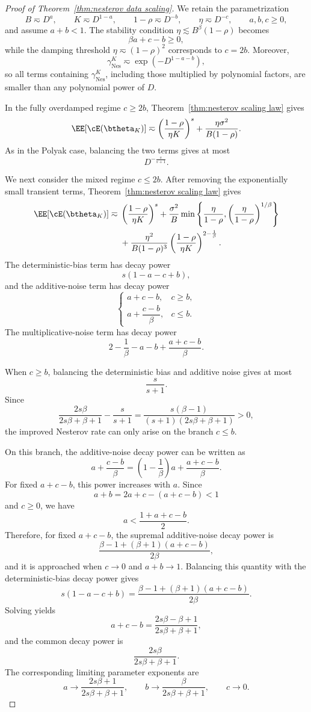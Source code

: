 \begin{proof}[Proof of Theorem~\ref{thm:nesterov data scaling}]
We retain the parametrization
\[
B\eqsim D^a,
\qquad
K\eqsim D^{1-a},
\qquad
1-\rho\eqsim D^{-b},
\qquad
\eta\eqsim D^{-c},
\qquad
a,b,c\geq0,
\]
and assume \(a+b<1\). The stability condition
\(\eta\lesssim B^\beta(1-\rho)\) becomes
\[
\beta a+c-b\geq0,
\]
while the damping threshold \(\eta\eqsim(1-\rho)^2\) corresponds to \(c=2b\).
Moreover,
\[
\gamma_{\mathrm{Nes}}^K
\eqsim
\exp\!\left(-D^{1-a-b}\right),
\]
so all terms containing \(\gamma_{\mathrm{Nes}}^K\), including those
multiplied by polynomial factors, are smaller than any polynomial power of
\(D\).

In the fully overdamped regime \(c\geq2b\),
Theorem~\ref{thm:nesterov scaling law} gives
\[
\EE[\cE(\btheta_K)]
\eqsim
\left(\frac{1-\rho}{\eta K}\right)^s
+
\frac{\eta\sigma^2}{B(1-\rho)}.
\]
As in the Polyak case, balancing the two terms gives at most
\[
D^{-\frac{s}{s+1}}.
\]

We next consider the mixed regime \(c\leq2b\). After removing the
exponentially small transient terms, Theorem~\ref{thm:nesterov scaling law}
gives
\[
\begin{aligned}
\EE[\cE(\btheta_K)]
\eqsim{}&
\left(\frac{1-\rho}{\eta K}\right)^s
+
\frac{\sigma^2}{B}
\min\left\{
\frac{\eta}{1-\rho},
\left(\frac{\eta}{1-\rho}\right)^{1/\beta}
\right\}\\
&+
\frac{\eta^2}{B(1-\rho)^3}
\left(\frac{1-\rho}{\eta K}\right)^{2-\frac1\beta}.
\end{aligned}
\]
The deterministic-bias term has decay power
\[
s(1-a-c+b),
\]
and the additive-noise term has decay power
\[
\begin{cases}
a+c-b, & c\geq b,\\[0.4em]
a+\dfrac{c-b}{\beta}, & c\leq b.
\end{cases}
\]
The multiplicative-noise term has decay power
\[
2-\frac1\beta-a-b+\frac{a+c-b}{\beta}.
\]

When \(c\geq b\), balancing the deterministic bias and additive noise gives
at most
\[
\frac{s}{s+1}.
\]
Since
\[
\frac{2s\beta}{2s\beta+\beta+1}
-
\frac{s}{s+1}
=
\frac{s(\beta-1)}
{(s+1)(2s\beta+\beta+1)}
>0,
\]
the improved Nesterov rate can only arise on the branch \(c\leq b\).

On this branch, the additive-noise decay power can be written as
\[
a+\frac{c-b}{\beta}
=
\left(1-\frac1\beta\right)a
+
\frac{a+c-b}{\beta}.
\]
For fixed \(a+c-b\), this power increases with \(a\). Since
\[
a+b
=
2a+c-(a+c-b)<1
\]
and \(c\geq0\), we have
\[
a<
\frac{1+a+c-b}{2}.
\]
Therefore, for fixed \(a+c-b\), the supremal additive-noise decay power is
\[
\frac{\beta-1+(\beta+1)(a+c-b)}{2\beta},
\]
and it is approached when \(c\to0\) and \(a+b\to1\). Balancing this quantity
with the deterministic-bias decay power gives
\[
s(1-a-c+b)
=
\frac{\beta-1+(\beta+1)(a+c-b)}{2\beta}.
\]
Solving yields
\[
a+c-b
=
\frac{2s\beta-\beta+1}{2s\beta+\beta+1},
\]
and the common decay power is
\[
\frac{2s\beta}{2s\beta+\beta+1}.
\]
The corresponding limiting parameter exponents are
\[
a\to
\frac{2s\beta+1}{2s\beta+\beta+1},
\qquad
b\to
\frac{\beta}{2s\beta+\beta+1},
\qquad
c\to0.
\]


\end{proof}
